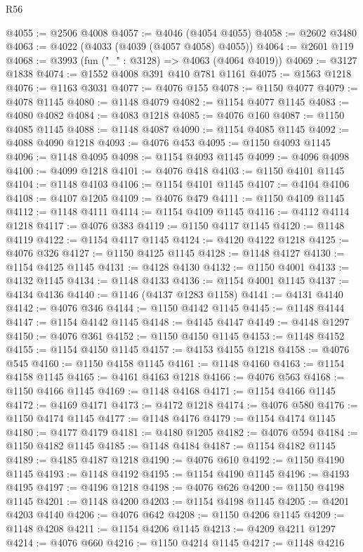 \begin{lexlean}{R56}
\begin{coremodule}
@4055 := @2506 @4008
@4057 := @4046 (@4054 @4055)
@4058 := @2602 @3480
@4063 := @4022 (@4033 (@4039 (@4057 @4058) @4055))
@4064 := @2601 @119
@4068 := @3993 (fun ("_" : @3128) => @4063 (@4064 @4019))
@4069 := @3127 @1838
@4074 := @1552 @4008 @391 @410 @781 @1161
@4075 := @1563 @1218
@4076 := @1163 @3031
@4077 := @4076 @155
@4078 := @1150 @4077
@4079 := @4078 @1145
@4080 := @1148 @4079
@4082 := @1154 @4077 @1145
@4083 := @4080 @4082
@4084 := @4083 @1218
@4085 := @4076 @160
@4087 := @1150 @4085 @1145
@4088 := @1148 @4087
@4090 := @1154 @4085 @1145
@4092 := @4088 @4090 @1218
@4093 := @4076 @453
@4095 := @1150 @4093 @1145
@4096 := @1148 @4095
@4098 := @1154 @4093 @1145
@4099 := @4096 @4098
@4100 := @4099 @1218
@4101 := @4076 @418
@4103 := @1150 @4101 @1145
@4104 := @1148 @4103
@4106 := @1154 @4101 @1145
@4107 := @4104 @4106
@4108 := @4107 @1205
@4109 := @4076 @479
@4111 := @1150 @4109 @1145
@4112 := @1148 @4111
@4114 := @1154 @4109 @1145
@4116 := @4112 @4114 @1218
@4117 := @4076 @383
@4119 := @1150 @4117 @1145
@4120 := @1148 @4119
@4122 := @1154 @4117 @1145
@4124 := @4120 @4122 @1218
@4125 := @4076 @326
@4127 := @1150 @4125 @1145
@4128 := @1148 @4127
@4130 := @1154 @4125 @1145
@4131 := @4128 @4130
@4132 := @1150 @4001
@4133 := @4132 @1145
@4134 := @1148 @4133
@4136 := @1154 @4001 @1145
@4137 := @4134 @4136
@4140 := @1146 (@4137 @1283 @1158)
@4141 := @4131 @4140
@4142 := @4076 @346
@4144 := @1150 @4142 @1145
@4145 := @1148 @4144
@4147 := @1154 @4142 @1145
@4148 := @4145 @4147
@4149 := @4148 @1297
@4150 := @4076 @361
@4152 := @1150 @4150 @1145
@4153 := @1148 @4152
@4155 := @1154 @4150 @1145
@4157 := @4153 @4155 @1218
@4158 := @4076 @545
@4160 := @1150 @4158 @1145
@4161 := @1148 @4160
@4163 := @1154 @4158 @1145
@4165 := @4161 @4163 @1218
@4166 := @4076 @563
@4168 := @1150 @4166 @1145
@4169 := @1148 @4168
@4171 := @1154 @4166 @1145
@4172 := @4169 @4171
@4173 := @4172 @1218
@4174 := @4076 @580
@4176 := @1150 @4174 @1145
@4177 := @1148 @4176
@4179 := @1154 @4174 @1145
@4180 := @4177 @4179
@4181 := @4180 @1205
@4182 := @4076 @594
@4184 := @1150 @4182 @1145
@4185 := @1148 @4184
@4187 := @1154 @4182 @1145
@4189 := @4185 @4187 @1218
@4190 := @4076 @610
@4192 := @1150 @4190 @1145
@4193 := @1148 @4192
@4195 := @1154 @4190 @1145
@4196 := @4193 @4195
@4197 := @4196 @1218
@4198 := @4076 @626
@4200 := @1150 @4198 @1145
@4201 := @1148 @4200
@4203 := @1154 @4198 @1145
@4205 := @4201 @4203 @4140
@4206 := @4076 @642
@4208 := @1150 @4206 @1145
@4209 := @1148 @4208
@4211 := @1154 @4206 @1145
@4213 := @4209 @4211 @1297
@4214 := @4076 @660
@4216 := @1150 @4214 @1145
@4217 := @1148 @4216

\end{coremodule}
\end{lexlean}
